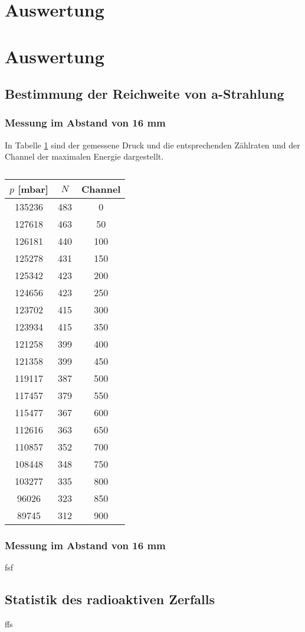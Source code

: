 \section{Auswertung}
\label{sec:Auswertung}

\section{Auswertung}
\label{sec:Auswertung}

\subsection{Bestimmung der Reichweite von a-Strahlung}

\subsubsection{Messung im Abstand von 16 mm}

In Tabelle \ref{tab:M1} sind der gemessene Druck und die entsprechenden Zählraten und der Channel der maximalen Energie dargestellt.
\begin{table}
  \centering
  \caption{}
  \label{tab:M1}
  \begin{tabular}{c c c}
    \toprule
    $p$ [mbar] & $N$ & Channel \\
    \midrule
    135236 &  483 &  0 \\
    127618 &  463 &  50 \\
    126181 &  440 &  100 \\
    125278 &  431 &  150 \\
    125342 &  423 &  200 \\
    124656 &  423 &  250 \\
    123702 &  415 &  300 \\
    123934 &  415 &  350 \\
    121258 &  399 &  400 \\
    121358 &  399 &  450 \\
    119117 &  387 &  500 \\
    117457 &  379 &  550 \\
    115477 &  367 &  600 \\
    112616 &  363 &  650 \\
    110857 &  352 &  700 \\
    108448 &  348 &  750 \\
    103277 &  335 &  800 \\
    96026  & 323  & 850 \\
    89745  & 312  & 900 \\
    \bottomrule
  \end{tabular}
\end{table}

\subsubsection{Messung im Abstand von 16 mm}
fsf
\subsection{Statistik des radioaktiven Zerfalls}
ffs

